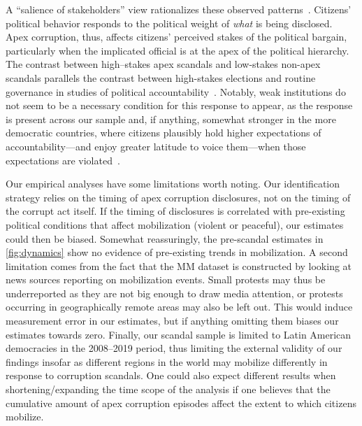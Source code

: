 \documentclass[11pt]{article}
\begin{document}
A ``salience of stakeholders'' view rationalizes these observed patterns~\citep{acemoglu2006origins,acemoglu2012nations,jha2013trade,jha2019valuing,jha2022markets}. Citizens' political behavior responds to the political weight of \textit{what} is being disclosed. Apex corruption, thus, affects citizens' perceived stakes of the political bargain, particularly when the implicated official is at the apex of the political hierarchy. The contrast between high--stakes apex scandals and low-stakes non-apex scandals parallels the contrast between high-stakes elections and routine governance in studies of political accountability~\citep{martinezbravo2022elites}. Notably, weak institutions do not seem to be a necessary condition for this response to appear, as the response is present across our sample and, if anything, somewhat stronger in the more democratic countries, where citizens plausibly hold higher expectations of accountability---and enjoy greater latitude to voice them---when those expectations are violated~\citep{acemoglu2019DemoEcoGrowth,acemoglu2024demobreedsupport,DuranteFutbol}.

Our empirical analyses have some limitations worth noting. Our identification strategy relies on the timing of apex corruption disclosures, not on the timing of the corrupt act itself. If the timing of disclosures is correlated with pre-existing political conditions that affect mobilization (violent or peaceful), our estimates could then be biased. Somewhat reassuringly, the pre-scandal estimates in \autoref{fig:dynamics} show no evidence of pre-existing trends in mobilization. A second limitation comes from the fact that the MM dataset is constructed by looking at news sources reporting on mobilization events. Small protests may thus be underreported as they are not big enough to draw media attention, or protests occurring in geographically remote areas may also be left out. This would induce measurement error in our estimates, but if anything omitting them biases our estimates towards zero. Finally, our scandal sample is limited to Latin American democracies in the 2008--2019 period, thus limiting the external validity of our findings insofar as different regions in the world may mobilize differently in response to corruption scandals. One could also expect different results when shortening/expanding the time scope of the analysis if one believes that the cumulative amount of apex corruption episodes affect the extent to which citizens mobilize.

\clearpage

\end{document}
